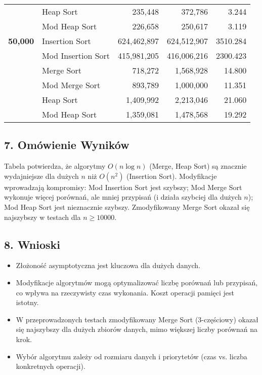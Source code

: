 \documentclass[12pt, a4paper]{article} %
\begin{document}
\begin{table}[H]
{\begin{tabular}{llrrr}
				& Heap Sort            &      235,448 &      372,786 &     3.244 \\
				& Mod Heap Sort        &      226,658 &      250,617 &     3.119 \\
				\midrule
				\textbf{50,000} & Insertion Sort       &  624,462,897 &  624,512,907 &  3510.284 \\
				& Mod Insertion Sort   &  415,981,205 &  416,006,216 &  2300.423 \\
				& Merge Sort           &      718,272 &    1,568,928 &    14.800 \\
				& Mod Merge Sort       &      893,789 &    1,000,000 &    11.351 \\
				& Heap Sort            &    1,409,992 &    2,213,046 &    21.060 \\
				& Mod Heap Sort        &    1,359,081 &    1,478,568 &    19.292 \\
				\bottomrule
			\end{tabular}%
		} %
	\end{table}
	
	\subsection*{7. Omówienie Wyników}
	Tabela potwierdza, że algorytmy $O(n \log n)$ (Merge, Heap Sort) są znacznie wydajniejsze dla dużych $n$ niż $O(n^2)$ (Insertion Sort). Modyfikacje wprowadzają kompromisy: Mod Insertion Sort jest szybszy; Mod Merge Sort wykonuje więcej porównań, ale mniej przypisań (i działa szybciej dla dużych $n$); Mod Heap Sort jest nieznacznie szybszy. Zmodyfikowany Merge Sort okazał się najszybszy w testach dla $n \ge 10000$.
	
	\newpage
	\subsection*{8. Wnioski}
	\begin{itemize}
		\item Złożoność asymptotyczna jest kluczowa dla dużych danych.
		\item Modyfikacje algorytmów mogą optymalizować liczbę porównań lub przypisań, co wpływa na rzeczywisty czas wykonania. Koszt operacji pamięci jest istotny.
		\item W przeprowadzonych testach zmodyfikowany Merge Sort (3-częściowy) okazał się najszybszy dla dużych zbiorów danych, mimo większej liczby porównań na krok.
		\item Wybór algorytmu zależy od rozmiaru danych i priorytetów (czas vs. liczba konkretnych operacji).
	\end{itemize}
	
\end{document}
